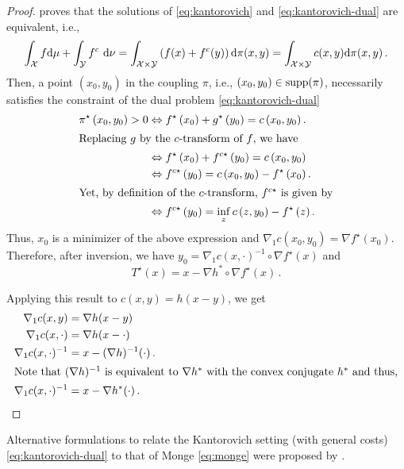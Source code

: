 \begin{proof}
\citet[Theorem 1.39]{santambrogio2015optimal} proves that the solutions of \eqref{eq:kantorovich} and \eqref{eq:kantorovich-dual} are equivalent, i.e.,
\begin{equation*}
	\int_{\mathcal{X}} f \mathrm{d} \mu+\int_{\mathcal{Y}} f^c \mathrm{~d} \nu=\int_{{\mathcal{X}} \times {\mathcal{Y}}}\left(f(x)+f^c(y)\right) \mathrm{d} \pi(x, y)=\int_{{\mathcal{X}} \times {\mathcal{Y}}} c(x, y) \mathrm{d} \pi(x, y)\,.
\end{equation*}
Then, a point $(x_0, y_0)$ in the coupling $\pi$, i.e., $(x_0, y_0) \in \operatorname{supp}(\pi)$, necessarily satisfies the constraint of the dual problem \eqref{eq:kantorovich-dual}
\begin{align*}
\pi^{\star}\left(x_0, y_0\right)>0 & \Leftrightarrow f^{\star}\left(x_0\right)+g^{\star}\left(y_0\right)=c\left(x_0, y_0\right). \\
\intertext{Replacing $g$ by the $c$-transform of $f$, we have}
& \Leftrightarrow f^{\star}\left(x_0\right)+ f^{c\star}\left(y_0\right)=c\left(x_0, y_0\right) \\
& \Leftrightarrow f^{c\star}\left(y_0\right)=c\left(x_0, y_0\right)-f^{\star}\left(x_0\right). \\
\intertext{Yet, by definition of the $c$-transform, $f^{c\star}$ is given by}
& \Leftrightarrow f^{c\star}\left(y_0\right)= \inf_z c\left(z, y_0\right)-f^{\star}\left(z\right).
\end{align*}
Thus, $x_0$ is a minimizer of the above expression and $\nabla_1 c\left(x_0, y_0\right)=\nabla f^{\star}\left(x_0\right)$.  
Therefore, after inversion, we have $y_0=\nabla_1 c(x, \cdot)^{-1} \circ \nabla f^{\star}(x)$ and
\begin{equation*}
		T^{\star}(x)=x-\nabla h^* \circ \nabla f^{\star}(x)\,.
	\end{equation*}

Applying this result to $c(x, y) = h(x-y)$, we get 
\begin{align*}
  \nabla_1 c(x, y) & =\nabla h(x-y) \\
  \nabla_1 c(x, \cdot) & =\nabla h(x-\cdot) \\
  \nabla_1 c(x, \cdot)^{-1} & =x-(\nabla h)^{-1}(\cdot)\,. \\ 
\intertext{Note that $(\nabla h)^{-1}$ is equivalent to $\nabla h^*$ with the convex conjugate $h^*$ and thus,}
  \nabla_1 c(x, \cdot)^{-1} & =x-\nabla h^*(\cdot)\,.	
\end{align*}
\end{proof}
Alternative formulations to relate the Kantorovich setting (with general costs) \eqref{eq:kantorovich-dual} to that of Monge \eqref{eq:monge} were proposed by \citet{ruschendorf1991bounds, ruschendorf1991frechet, caffarelli2017allocation}. \\

